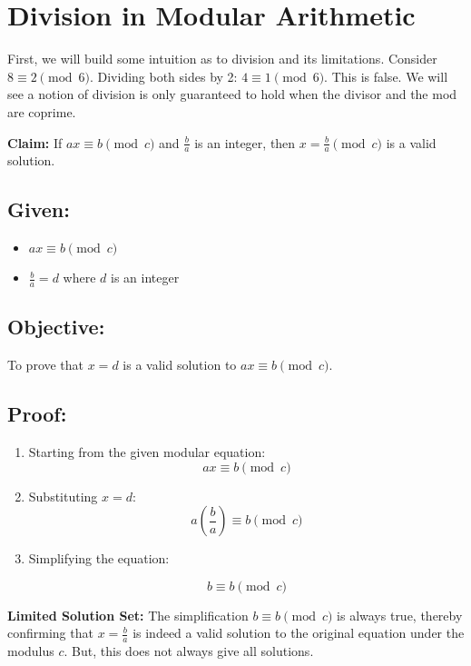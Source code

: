 \documentclass{article}
\begin{document}
\section*{Division in Modular Arithmetic}

First, we will build some intuition as to division and its limitations.
Consider \(8 \equiv 2 \pmod{6}\). Dividing both sides by 2: \(4 \equiv 1 \pmod{6}\). This is false. We will see a notion of division is only guaranteed to hold when the divisor and the mod are coprime.

\textbf{Claim:} If \(ax \equiv b \pmod{c}\) and \(\frac{b}{a}\) is an integer, then \(x = \frac{b}{a} \pmod{c}\) is a valid solution.

\subsection*{Given:}
\begin{itemize}
    \item \(ax \equiv b \pmod{c}\)
    \item \(\frac{b}{a} = d\) where \(d\) is an integer
\end{itemize}

\subsection*{Objective:}
To prove that \(x = d\) is a valid solution to \(ax \equiv b \pmod{c}\).

\subsection*{Proof:}

\begin{enumerate}
    \item Starting from the given modular equation:
    \[ ax \equiv b \pmod{c} \]
    
    \item Substituting \(x = d\):
    \[ a\left(\frac{b}{a}\right) \equiv b \pmod{c} \]

    \item Simplifying the equation:
  
    \[ b \equiv b \pmod{c} \]

\end{enumerate}

\textbf{Limited Solution Set:}
    The simplification \(b \equiv b \pmod{c}\) is always true, thereby confirming that \(x = \frac{b}{a}\) is indeed a valid solution to the original equation under the modulus \(c\). But, this does not always give all solutions.
\end{document}
